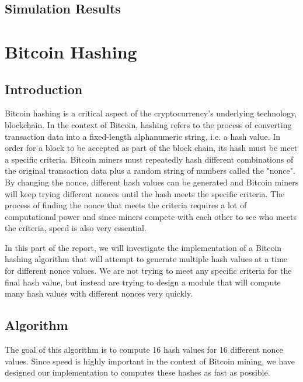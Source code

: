 \documentclass{article}
\begin{document}



\subsection{Simulation Results}


\newpage
\section{Bitcoin Hashing}

\subsection{Introduction}


Bitcoin hashing is a critical aspect of the cryptocurrency's underlying technology, blockchain. In the context of Bitcoin, hashing refers to the process of converting transaction data into a fixed-length alphanumeric string, i.e. a hash value. In order for a block to be accepted as part of the block chain, its hash must be meet a specific criteria. Bitcoin miners must repeatedly hash different combinations of the original transaction data plus a random string of numbers called the "nonce". By changing the nonce, different hash values can be generated and Bitcoin miners will keep trying different nonces until the hash meets the specific criteria. The process of finding the nonce that meets the criteria requires a lot of computational power and since miners compete with each other to see who meets the criteria, speed is also very essential.

In this part of the report, we will investigate the implementation of a Bitcoin hashing algorithm that will attempt to generate multiple hash values at a time for different nonce values. We are not trying to meet any specific criteria for the final hash value, but instead are trying to design a module that will compute many hash values with different nonces very quickly.

\subsection{Algorithm}

The goal of this algorithm is to compute 16 hash values for 16 different nonce values. Since speed is highly important in the context of Bitcoin mining, we have designed our implementation to computes these hashes as fast as possible.
\end{document}

